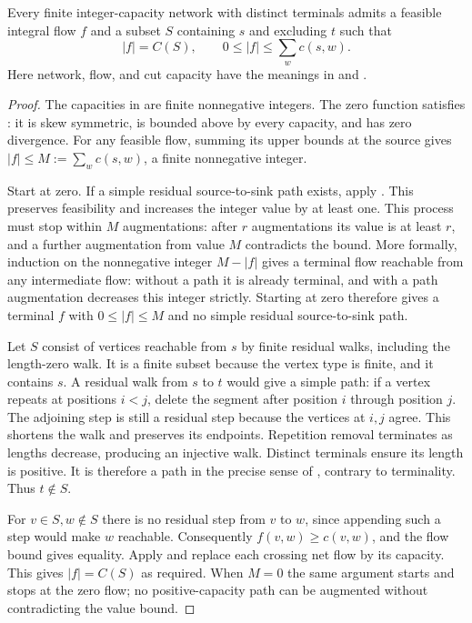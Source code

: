 \begin{lemma}
Every finite integer-capacity network with distinct terminals admits a
feasible integral flow $f$ and a subset $S$ containing $s$ and excluding
$t$ such that
\[
 |f|=C(S),\qquad 0\leq |f|\leq\sum_w c(s,w).
\]
Here network, flow, and cut capacity have the meanings in
 and .
\end{lemma}
\begin{proof}
The capacities in  are finite nonnegative
integers. The zero function satisfies : it is
skew symmetric, is bounded above by every capacity, and has zero divergence.
For any feasible flow, summing its upper bounds at the source gives
$|f|\leq M:=\sum_w c(s,w)$, a finite nonnegative integer.

Start at zero. If a simple residual source-to-sink path exists, apply
. This preserves feasibility and
increases the integer value by at least one. This process must stop
within $M$ augmentations: after $r$ augmentations its value is at least
$r$, and a further augmentation from value $M$ contradicts the bound.
More formally, induction on the nonnegative integer $M-|f|$ gives a
terminal flow reachable from any intermediate flow: without a path it
is already terminal, and with a path augmentation decreases this integer
strictly. Starting at zero therefore gives a terminal $f$ with
$0\leq |f|\leq M$ and no simple residual source-to-sink path.

Let $S$ consist of vertices reachable from $s$ by finite residual walks,
including the length-zero walk. It is a finite subset because the vertex
type is finite, and it contains $s$. A residual walk from $s$ to $t$
would give a simple path: if a vertex repeats at positions $i<j$, delete
the segment after position $i$ through position $j$. The adjoining step
is still a residual step because the vertices at $i,j$ agree. This
shortens the walk and preserves its endpoints. Repetition removal
terminates as lengths decrease, producing an injective walk. Distinct
terminals ensure its length is positive. It is therefore a path in the
precise sense of , contrary to terminality.
Thus $t\notin S$.

For $v\in S,w\notin S$ there is no residual step from $v$ to $w$,
since appending such a step would make $w$ reachable. Consequently
$f(v,w)\geq c(v,w)$, and the flow bound gives equality. Apply
 and replace each crossing net flow
by its capacity. This gives $|f|=C(S)$ as required. When $M=0$ the same
argument starts and stops at the zero flow; no positive-capacity path
can be augmented without contradicting the value bound.
\end{proof}
